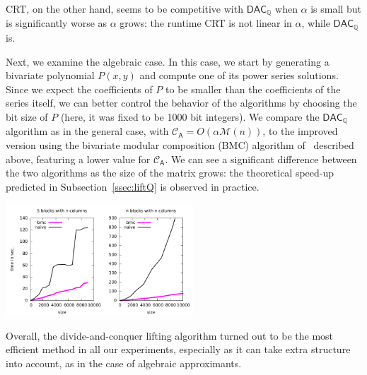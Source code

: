 \documentclass[sigconf]{acmart}
\newcommand{\mA}{\ensuremath{\mathsf{A}}}
\newcommand{\Q}{\ensuremath{\mathbb{Q}}}
\newcommand{\M}{\ensuremath{\mathscr{M}}}
\newcommand{\CA}{\ensuremath{\mathscr{C}_\mA}}
\newcommand{\DACQ}{\ensuremath{\mathsf{DAC}_\Q}}
\theoremstyle{acmdefinition}
\begin{document}
CRT, on the other hand, seems to be competitive with $\DACQ$ when
$\alpha$ is small but is significantly worse as $\alpha$ grows: the
runtime CRT is not linear in $\alpha$, while $\DACQ$ is. 

Next, we examine the algebraic case. In this case, we start by
generating a bivariate polynomial $P(x,y)$ and compute one of its
power series solutions. Since we expect the coefficients of $P$ to be
smaller than the coefficients of the series itself, we can better
control the behavior of the algorithms by choosing the bit size of
$P$ (here, it was fixed to be 1000 bit integers).  We compare the
$\DACQ$ algorithm as in the general case, with $\CA=O(\alpha \M(n))$,
to the improved version using the bivariate modular composition (BMC)
algorithm of~\cite{NuZi04} described above, featuring a lower value
for $\CA$. We can see a significant difference between the two
algorithms as the size of the matrix grows: the theoretical speed-up
predicted in Subsection~\ref{ssec:liftQ} is observed in practice.

\includegraphics[width=7cm]{plots/compare-algebraic.pdf}

Overall, the divide-and-conquer lifting algorithm turned out to be the
most efficient method in all our experiments, especially as it can
take extra structure into account, as in the case of algebraic
approximants.



 {\tiny }
\end{document}
